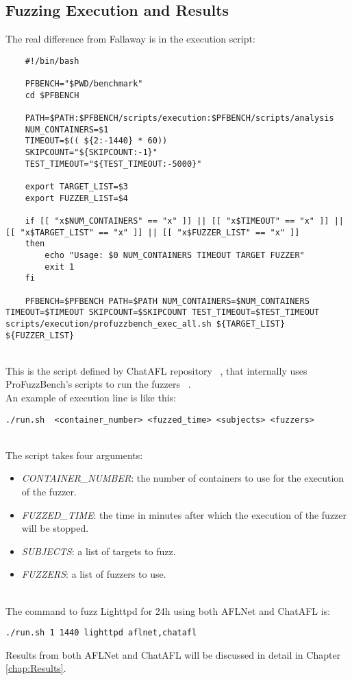 \subsection{Fuzzing Execution and Results}

The real difference from Fallaway is in the execution script:\\
\begin{lstlisting}
    #!/bin/bash

    PFBENCH="$PWD/benchmark"
    cd $PFBENCH

    PATH=$PATH:$PFBENCH/scripts/execution:$PFBENCH/scripts/analysis
    NUM_CONTAINERS=$1
    TIMEOUT=$(( ${2:-1440} * 60))
    SKIPCOUNT="${SKIPCOUNT:-1}"
    TEST_TIMEOUT="${TEST_TIMEOUT:-5000}"

    export TARGET_LIST=$3
    export FUZZER_LIST=$4

    if [[ "x$NUM_CONTAINERS" == "x" ]] || [[ "x$TIMEOUT" == "x" ]] || [[ "x$TARGET_LIST" == "x" ]] || [[ "x$FUZZER_LIST" == "x" ]]
    then
        echo "Usage: $0 NUM_CONTAINERS TIMEOUT TARGET FUZZER"
        exit 1
    fi

    PFBENCH=$PFBENCH PATH=$PATH NUM_CONTAINERS=$NUM_CONTAINERS TIMEOUT=$TIMEOUT SKIPCOUNT=$SKIPCOUNT TEST_TIMEOUT=$TEST_TIMEOUT scripts/execution/profuzzbench_exec_all.sh ${TARGET_LIST} ${FUZZER_LIST}
\end{lstlisting}
\phantom{}\\
This is the script defined by ChatAFL repository ~\cite{chataflgithub}, that internally uses ProFuzzBench's scripts to run the fuzzers ~\cite{chataflgithubprofuz}.
\\An example of execution line is like this:\\
\begin{lstlisting}
./run.sh  <container_number> <fuzzed_time> <subjects> <fuzzers>
\end{lstlisting}
\phantom{}\\
The script takes four arguments:\\
\begin{itemize}
    \item \textit{CONTAINER\_NUMBER}: the number of containers to use for the execution of the fuzzer.
    \item \textit{FUZZED\_TIME}: the time in minutes after which the execution of the fuzzer will be stopped.
    \item \textit{SUBJECTS}: a list of targets to fuzz.
    \item \textit{FUZZERS}: a list of fuzzers to use.
\end{itemize}
\phantom{}\\
The command to fuzz Lighttpd for 24h using both AFLNet and ChatAFL is:
\begin{lstlisting}
./run.sh 1 1440 lighttpd aflnet,chatafl
\end{lstlisting}
Results from both AFLNet and ChatAFL will be discussed in detail in Chapter \ref{chap:Results}.